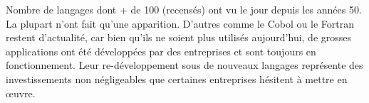 \documentclass[a4paper,12pt]{article} %
\begin{document}
Nombre de langages dont + de 100 (recensés) ont vu le jour depuis les années 50. La plupart n’ont fait qu’une apparition. D’autres comme le Cobol ou le Fortran restent d’actualité, car bien qu’ils ne soient plus utilisés aujourd’hui, de grosses applications ont été développées par des entreprises et sont toujours en fonctionnement. Leur re-développement sous de nouveaux langages représente des investissements non négligeables que certaines entreprises hésitent à mettre en œuvre.
\end{document}

